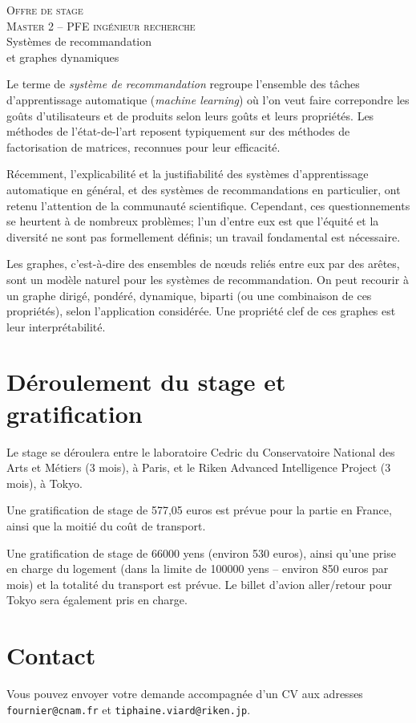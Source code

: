 \documentclass[a4paper, 12pt]{article}
\newcommand{\dest}{ 
    \textsc{\Large Offre de stage \\ 
    Master 2 -- PFE ingénieur recherche}\\[1ex]
    {\Huge Systèmes de recommandation \\
    et graphes dynamiques}
  }
\begin{document}
\pagestyle{fancy} 

\addvspace{1cm}
\begin{center}
  \dest
\end{center}

\addvspace{1cm}

Le terme de {\em système de recommandation} regroupe l'ensemble des tâches d'apprentissage automatique ({\em machine learning}) où l'on veut faire correpondre les goûts d'utilisateurs et de produits selon leurs goûts et leurs propriétés. 
Les méthodes de l'état-de-l'art reposent typiquement sur des méthodes de factorisation de matrices, reconnues pour leur efficacité.

Récemment, l'explicabilité et la justifiabilité des systèmes d'apprentissage automatique en général, et des systèmes de recommandations en particulier, ont retenu l'attention de la communauté scientifique.
Cependant, ces questionnements se heurtent à de nombreux problèmes; l'un d'entre eux est que l'équité et la diversité ne sont pas formellement définis; un travail fondamental est nécessaire.

Les graphes, c'est-à-dire des ensembles de n\oe{}uds reliés entre eux par des arêtes, sont un modèle naturel pour les systèmes de recommandation.
On peut recourir à un graphe dirigé, pondéré, dynamique, biparti (ou une combinaison de ces propriétés), selon l'application considérée.
Une propriété clef de ces graphes est leur interprétabilité.

\section{Déroulement du stage et gratification}

Le stage se déroulera entre le laboratoire Cedric du Conservatoire National des Arts et Métiers (3 mois), à Paris, et le Riken Advanced Intelligence Project (3 mois), à Tokyo.

Une gratification de stage de 577,05 euros est prévue pour la partie en France, ainsi que la moitié du coût de transport.

Une gratification de stage de 66000 yens (environ 530 euros), ainsi qu'une prise en charge du logement (dans la limite de 100000 yens -- environ 850 euros par mois) et la totalité du transport est prévue. Le billet d'avion aller/retour pour Tokyo sera également pris en charge.

\section{Contact}

Vous pouvez envoyer votre demande accompagnée d'un CV aux adresses \texttt{fournier@cnam.fr} et \texttt{tiphaine.viard@riken.jp}.
\end{document}
